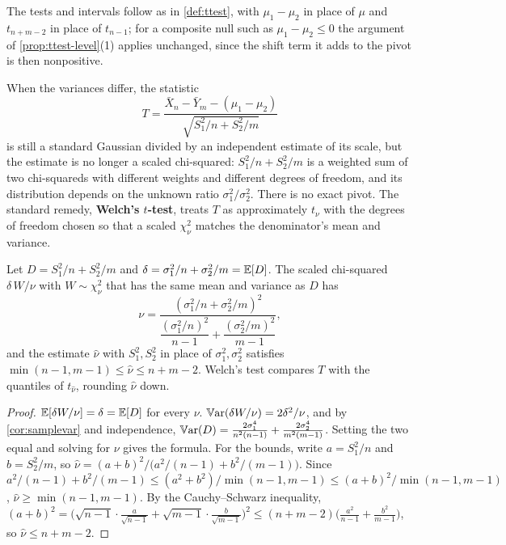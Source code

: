 The tests and intervals follow as in \cref{def:ttest}, with $\mu_1 - \mu_2$ in place of $\mu$ and $t_{n+m-2}$ in place of $t_{n-1}$; for a composite null such as $\mu_1 - \mu_2 \leq 0$ the argument of \cref{prop:ttest-level}(1) applies unchanged, since the shift term it adds to the pivot is then nonpositive.

When the variances differ, the statistic
\[
T = \frac{\bar{X}_n - \bar{Y}_m - (\mu_1 - \mu_2)}{\sqrt{S_1^2/n + S_2^2/m}}
\]
is still a standard Gaussian divided by an independent estimate of its scale, but the estimate is no longer a scaled chi-squared: $S_1^2/n + S_2^2/m$ is a weighted sum of two chi-squareds with different weights and different degrees of freedom, and its distribution depends on the unknown ratio $\sigma_1^2/\sigma_2^2$.
There is no exact pivot.
The standard remedy, \textbf{Welch's $t$-test}, treats $T$ as approximately $t_\nu$ with the degrees of freedom chosen so that a scaled $\chi^2_\nu$ matches the denominator's mean and variance.

\begin{proposition}
\label{prop:welch}
Let $D = S_1^2/n + S_2^2/m$ and $\delta = \sigma_1^2/n + \sigma_2^2/m = \operatorname*{\mathbb{E}}[D]$.
The scaled chi-squared $\delta\,W/\nu$ with $W \sim \chi^2_\nu$ that has the same mean and variance as $D$ has
\[
\nu = \frac{(\sigma_1^2/n + \sigma_2^2/m)^2}{\dfrac{(\sigma_1^2/n)^2}{n-1} + \dfrac{(\sigma_2^2/m)^2}{m-1}},
\]
and the estimate $\hat{\nu}$ with $S_1^2, S_2^2$ in place of $\sigma_1^2, \sigma_2^2$ satisfies $\min(n-1, m-1) \leq \hat{\nu} \leq n + m - 2$.
Welch's test compares $T$ with the quantiles of $t_{\hat{\nu}}$, rounding $\hat{\nu}$ down.
\end{proposition}

\begin{proof}
$\operatorname*{\mathbb{E}}[\delta W/\nu] = \delta = \operatorname*{\mathbb{E}}[D]$ for every $\nu$.
$\operatorname*{\mathbb{V}\text{ar}}(\delta W/\nu) = 2\delta^2/\nu$, and by \cref{cor:samplevar} and independence, $\operatorname*{\mathbb{V}\text{ar}}(D) = \frac{2\sigma_1^4}{n^2(n-1)} + \frac{2\sigma_2^4}{m^2(m-1)}$.
Setting the two equal and solving for $\nu$ gives the formula.
For the bounds, write $a = S_1^2/n$ and $b = S_2^2/m$, so $\hat{\nu} = (a+b)^2/\big(a^2/(n-1) + b^2/(m-1)\big)$.
Since $a^2/(n-1) + b^2/(m-1) \leq (a^2 + b^2)/\min(n-1, m-1) \leq (a+b)^2/\min(n-1,m-1)$, $\hat{\nu} \geq \min(n-1, m-1)$.
By the Cauchy--Schwarz inequality, $(a + b)^2 = \big(\sqrt{n-1}\cdot\frac{a}{\sqrt{n-1}} + \sqrt{m-1}\cdot\frac{b}{\sqrt{m-1}}\big)^2 \leq (n + m - 2)\big(\frac{a^2}{n-1} + \frac{b^2}{m-1}\big)$, so $\hat{\nu} \leq n + m - 2$.
\end{proof}

